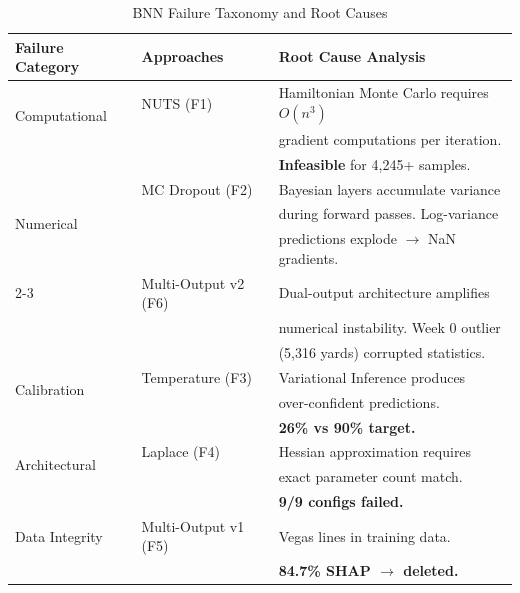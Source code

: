 \begin{table}[htbp]
\centering
\small
\caption{BNN Failure Taxonomy and Root Causes}
\label{tab:bnn_failure_taxonomy}
\begin{tabular}{llp{6cm}}
\toprule
\textbf{Failure Category} & \textbf{Approaches} & \textbf{Root Cause Analysis} \\
\midrule
\multirow{2}{*}{Computational} & NUTS (F1) & Hamiltonian Monte Carlo requires $O(n^3)$ \\
                               & & gradient computations per iteration. \\
                               & & \textbf{Infeasible} for 4,245+ samples. \\
\midrule
\multirow{3}{*}{Numerical} & MC Dropout (F2) & Bayesian layers accumulate variance \\
                           & & during forward passes. Log-variance \\
                           & & predictions explode $\rightarrow$ NaN gradients. \\
\cmidrule{2-3}
                           & Multi-Output v2 (F6) & Dual-output architecture amplifies \\
                           & & numerical instability. Week 0 outlier \\
                           & & (5,316 yards) corrupted statistics. \\
\midrule
\multirow{2}{*}{Calibration} & Temperature (F3) & Variational Inference produces \\
                             & & over-confident predictions. \\
                             & & \textbf{26\% vs 90\% target.} \\
\midrule
\multirow{2}{*}{Architectural} & Laplace (F4) & Hessian approximation requires \\
                               & & exact parameter count match. \\
                               & & \textbf{9/9 configs failed.} \\
\midrule
Data Integrity & Multi-Output v1 (F5) & Vegas lines in training data. \\
               & & \textbf{84.7\% SHAP $\rightarrow$ deleted.} \\
\bottomrule
\end{tabular}
\end{table}


